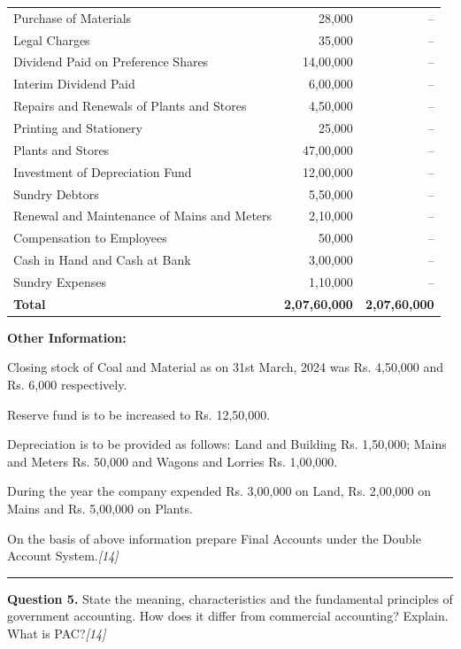 \documentclass[11pt,a4paper]{article}
\newcommand{\pts}[1]{\hfill   \textit{[#1]}}
\begin{document}
\begin{center}
\begin{tabular}{|l|r|r|}
Purchase of Materials & 28,000 & -- \\
Legal Charges & 35,000 & -- \\
Dividend Paid on Preference Shares & 14,00,000 & -- \\
Interim Dividend Paid & 6,00,000 & -- \\
Repairs and Renewals of Plants and Stores & 4,50,000 & -- \\
Printing and Stationery & 25,000 & -- \\
Plants and Stores & 47,00,000 & -- \\
Investment of Depreciation Fund & 12,00,000 & -- \\
Sundry Debtors & 5,50,000 & -- \\
Renewal and Maintenance of Mains and Meters & 2,10,000 & -- \\
Compensation to Employees & 50,000 & -- \\
Cash in Hand and Cash at Bank & 3,00,000 & -- \\
Sundry Expenses & 1,10,000 & -- \\
\hline
   \textbf{Total} &   \textbf{2,07,60,000} &   \textbf{2,07,60,000} \\
\hline
\end{tabular}
\end{center}




\noindent   \textbf{Other Information:}

\begin{parts}
  \item Closing stock of Coal and Material as on 31st March, 2024 was Rs. 4,50,000 and Rs. 6,000 respectively.
  \item Reserve fund is to be increased to Rs. 12,50,000.
  \item Depreciation is to be provided as follows: Land and Building Rs. 1,50,000; Mains and Meters Rs. 50,000 and Wagons and Lorries Rs. 1,00,000.
  \item During the year the company expended Rs. 3,00,000 on Land, Rs. 2,00,000 on Mains and Rs. 5,00,000 on Plants.
\end{parts}
On the basis of above information prepare Final Accounts under the Double Account System.\pts{14}

\medskip\rule{\linewidth}{0.2pt}




\noindent   \textbf{Question 5.}
State the meaning, characteristics and the fundamental principles of government accounting. How does it differ from commercial accounting? Explain. What is PAC?\pts{14}
\end{document}
